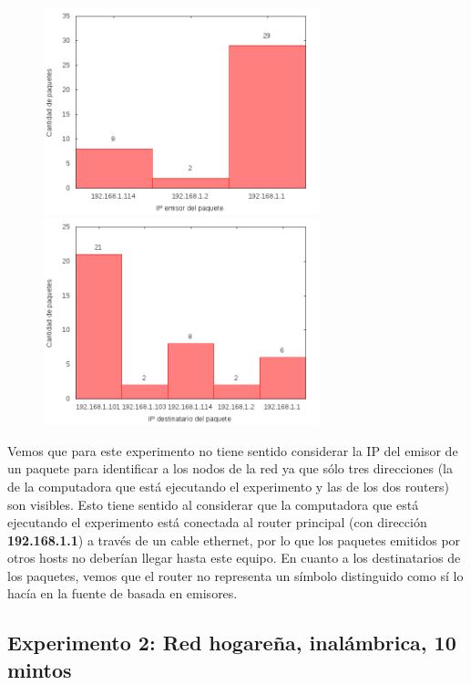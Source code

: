 \begin{figure}[!h]
\centering
\begin{minipage}{8cm}
  \centering
  \includegraphics[width=8cm]{../mediciones/home-eth-10/home-eth-10IpsSrcArp.png}
\end{minipage}%
\begin{minipage}{8cm}
  \centering
  \includegraphics[width=8cm]{../mediciones/home-eth-10/home-eth-10IpsDstArp.png}
\end{minipage}
\end{figure}

Vemos que para este experimento no tiene sentido considerar la IP del emisor de un paquete para identificar a los nodos de la red ya que sólo tres direcciones
(la de la computadora que está ejecutando el experimento y las de los dos routers) son visibles. Esto tiene sentido al considerar que la computadora que
está ejecutando el experimento está conectada al router principal (con dirección \textbf{192.168.1.1}) a través de un cable ethernet, por lo que los paquetes emitidos
por otros hosts no deberían llegar hasta este equipo. En cuanto a los destinatarios de los paquetes, vemos que el router no representa un símbolo distinguido
como sí lo hacía en la fuente de basada en emisores.

\subsection{Experimento 2: Red hogareña, inalámbrica, 10 mintos}

